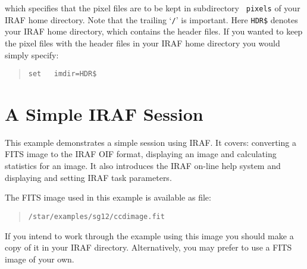 \documentclass[twoside,11pt]{article}
\newcommand{\xlabel}[1]{}
\begin{document}
which specifies that the pixel files are to be kept in subdirectory {\tt
pixels} of your IRAF home directory.  Note that the trailing `{\tt /}' is
important.  Here {\tt HDR\$} denotes your IRAF home directory, which
contains the header files.  If you wanted to keep the pixel files with
the header files in your IRAF home directory you would simply specify:

\begin{quote}
{\tt set ~ imdir=HDR\$}
\end{quote}


\newpage
\section{\xlabel{SESSION}\label{SESSION}A Simple IRAF Session}

This example demonstrates a simple session using IRAF.  It covers:
converting a FITS image to the IRAF OIF format, displaying an image
and calculating statistics for an image.  It also introduces the
IRAF on-line help system and displaying and setting IRAF task
parameters.

The FITS image used in this example is available as file:

\begin{quote}
{\tt /star/examples/sg12/ccdimage.fit}
\end{quote}

If you intend to work through the example using this image you should make
a copy of it in your IRAF directory.  Alternatively, you may prefer
to use a FITS image of your own.
\end{document}

